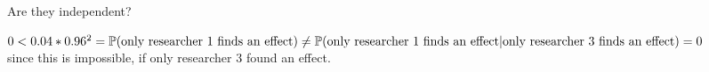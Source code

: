 \documentclass[a4paper, 12pt]{article}
\begin{document}
\begin{enumerate}
    Are they independent?
    
    $0 < 0.04*0.96^2 = \\
    \mathbb{P}(\text{only researcher 1 finds an effect}) \neq \\
    \mathbb{P}(\text{only researcher 1 finds an effect}|\text{only researcher 3 finds an effect}) = 0$ \\
    since this is impossible, if only researcher 3 found an effect.
    
    
    
\end{enumerate}
\end{document}
